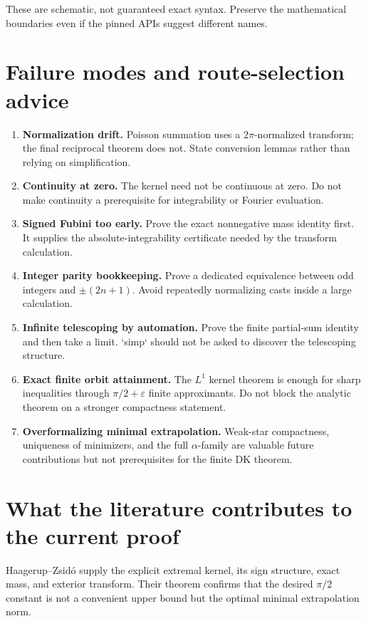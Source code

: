 These are schematic, not guaranteed exact syntax. Preserve the mathematical boundaries even if the pinned APIs suggest different names.

\section{Failure modes and route-selection advice}

\begin{enumerate}[leftmargin=2em]
\item \textbf{Normalization drift.} Poisson summation uses a $2\pi$-normalized transform; the final reciprocal theorem does not. State conversion lemmas rather than relying on simplification.
\item \textbf{Continuity at zero.} The kernel need not be continuous at zero. Do not make continuity a prerequisite for integrability or Fourier evaluation.
\item \textbf{Signed Fubini too early.} Prove the exact nonnegative mass identity first. It supplies the absolute-integrability certificate needed by the transform calculation.
\item \textbf{Integer parity bookkeeping.} Prove a dedicated equivalence between odd integers and $\pm(2n+1)$. Avoid repeatedly normalizing casts inside a large calculation.
\item \textbf{Infinite telescoping by automation.} Prove the finite partial-sum identity and then take a limit. `simp` should not be asked to discover the telescoping structure.
\item \textbf{Exact finite orbit attainment.} The $L^1$ kernel theorem is enough for sharp inequalities through $\pi/2+\varepsilon$ finite approximants. Do not block the analytic theorem on a stronger compactness statement.
\item \textbf{Overformalizing minimal extrapolation.} Weak-star compactness, uniqueness of minimizers, and the full $\alpha$-family are valuable future contributions but not prerequisites for the finite DK theorem.
\end{enumerate}

\section{What the literature contributes to the current proof}

Haagerup--Zsid\'o supply the explicit extremal kernel, its sign structure, exact mass, and exterior transform. Their theorem confirms that the desired $\pi/2$ constant is not a convenient upper bound but the optimal minimal extrapolation norm.


